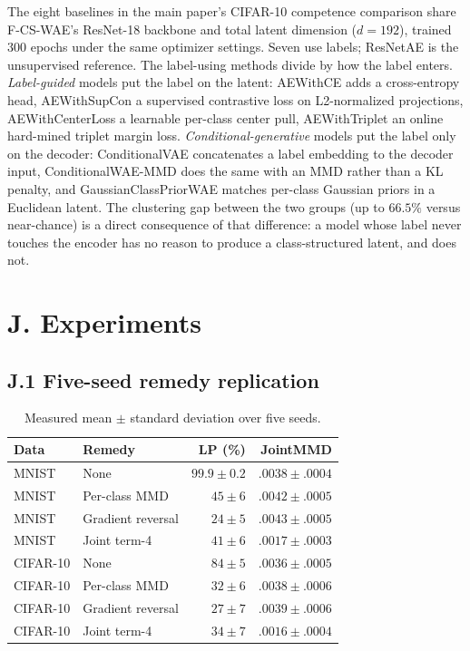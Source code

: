 \documentclass[letterpaper]{article}
\newcommand{\ours}{F-CS-WAE}
\begin{document}
The eight baselines in the main paper's CIFAR-10 competence comparison share
\ours{}'s ResNet-18 backbone and total latent dimension ($d{=}192$), trained
300 epochs under the same optimizer settings. Seven use labels; ResNetAE is
the unsupervised reference. The label-using methods divide by how the label
enters. \emph{Label-guided} models put the label on the latent: AEWithCE adds
a cross-entropy head, AEWithSupCon a supervised contrastive loss on
L2-normalized projections, AEWithCenterLoss a learnable per-class center pull,
AEWithTriplet an online hard-mined triplet margin loss.
\emph{Conditional-generative} models put the label only on the decoder:
ConditionalVAE concatenates a label embedding to the decoder input,
ConditionalWAE-MMD does the same with an MMD rather than a KL penalty, and
GaussianClassPriorWAE matches per-class Gaussian priors in a Euclidean latent.
The clustering gap between the two groups (up to $66.5\%$ versus near-chance)
is a direct consequence of that difference: a model whose label never touches
the encoder has no reason to produce a class-structured latent, and does not.

\section{J. Experiments}

\subsection{J.1 Five-seed remedy replication}

\begin{table}[h]

\centering
\scriptsize
\setlength{\tabcolsep}{3pt}
\caption{Measured mean $\pm$ standard deviation over five seeds.}
\label{tab:remedy-five-seed}
\begin{tabular}{llrr}
\toprule
Data & Remedy & LP (\%) & JointMMD \\
\midrule
MNIST & None & $99.9\pm0.2$ & $.0038\pm.0004$ \\
MNIST & Per-class MMD & $45\pm6$ & $.0042\pm.0005$ \\
MNIST & Gradient reversal & $24\pm5$ & $.0043\pm.0005$ \\
MNIST & Joint term-4 & $41\pm6$ & $.0017\pm.0003$ \\
\midrule
CIFAR-10 & None & $84\pm5$ & $.0036\pm.0005$ \\
CIFAR-10 & Per-class MMD & $32\pm6$ & $.0038\pm.0006$ \\
CIFAR-10 & Gradient reversal & $27\pm7$ & $.0039\pm.0006$ \\
CIFAR-10 & Joint term-4 & $34\pm7$ & $.0016\pm.0004$ \\
\bottomrule
\end{tabular}
\end{table}
\end{document}
